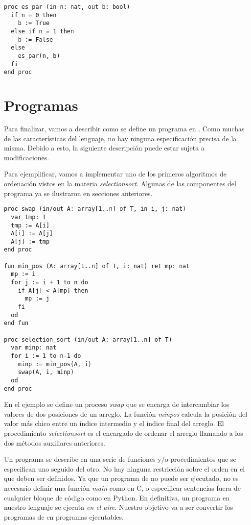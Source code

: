 \documentclass{article}
\begin{document}
\begin{lstlisting}
proc es_par (in n: nat, out b: bool)
  if n = 0 then
    b := True
  else if n = 1 then
    b := False
  else
    es_par(n, b)
  fi
end proc
\end{lstlisting}

\section{Programas}

Para finalizar, vamos a describir como se define un programa en \Lang.
Como muchas de las características del lenguaje, no hay ninguna especificación precisa de la misma.
Debido a esto, la siguiente descripción puede estar sujeta a modificaciones.

Para ejemplificar, vamos a implementar uno de los primeros algoritmos de ordenación vistos en la materia \textit{selection\gbajo sort}.
Algunas de las componentes del programa ya se ilustraron en secciones anteriores.

\begin{lstlisting}
proc swap (in/out A: array[1..n] of T, in i, j: nat)
  var tmp: T
  tmp := A[i]
  A[i] := A[j]
  A[j] := tmp
end proc

fun min_pos (A: array[1..n] of T, i: nat) ret mp: nat
  mp := i
  for j := i + 1 to n do
    if A[j] < A[mp] then
      mp := j
    fi
  od
end fun

proc selection_sort (in/out A: array[1..n] of T)
  var minp: nat
  for i := 1 to n-1 do
    minp := min_pos(A, i)
    swap(A, i, minp)
  od
end proc
\end{lstlisting}

En el ejemplo se define un proceso \textit{swap} que se encarga de intercambiar los valores de dos posiciones de un arreglo.
La función \textit{min\gbajo pos} calcula la posición del valor más chico entre un índice intermedio y el índice final del arreglo.
El procedimiento \textit{selection\gbajo sort} es el encargado de ordenar el arreglo llamando a los dos métodos auxiliares anteriores.

Un programa se describe en una serie de funciones y/o procedimientos que se especifican uno seguido del otro.
No hay ninguna restricción sobre el orden en el que deben ser definidos.
Ya que un programa de \Lang\space no puede ser ejecutado, no es necesario definir una función \textit{main} como en C, o especificar sentencias fuera de cualquier bloque de código como en Python.
En definitiva, un programa en nuestro lenguaje se ejecuta \textit{en el aire}.
Nuestro objetivo va a ser convertir los programas de \Lang\space en programas ejecutables.
\end{document}
